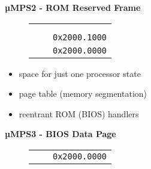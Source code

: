 \documentclass{beamer}
\begin{document}
\begin{frame}
\begin{center}
\begin{minipage}{0.48\textwidth}
\begin{block}{\textbf{{\small µMPS2 - ROM Reserved Frame}}}
\begin{figure}[h]
\begin{tabular}{rcl}
						\multicolumn{1}{l|}{}                                                    & \multicolumn{1}{c|}{\cellcolor{nord13}}                                                      &                                               \\
						\multicolumn{1}{l|}{}                                                    & \multicolumn{1}{c|}{\cellcolor{nord13}}                                                      &                                               \\
						\multicolumn{1}{l|}{}                                                    & \multicolumn{1}{c|}{\cellcolor{nord13}}                                                      & \multirow{2}{*}{\texttt{{\tiny 0x2000.1000}}} \\ \hhline{~-~}
						\multicolumn{1}{l|}{}                                                    & \multicolumn{1}{c|}{\cellcolor{nord12}}                                                      &                                               \\
						\multicolumn{1}{l|}{}                                                    & \multicolumn{1}{c|}{\multirow{-2}{*}{\cellcolor{nord12}{\tiny \textit{ROM Reserved Frame}}}} & \multirow{2}{*}{\texttt{{\tiny 0x2000.0000}}} \\ \hhline{--~}
					\end{tabular}
				\end{figure}
				\begin{scriptsize}
					\begin{itemize}
						\item space for just one processor state
						\item page table (memory segmentation)
						\item reentrant ROM (BIOS) handlers
					\end{itemize}
				\end{scriptsize}
			\end{block}
		\end{minipage}
		\hspace{0pt plus 1 filll}
		\begin{minipage}{0.47\textwidth}
			\begin{block}{\textbf{{\small µMPS3 - BIOS Data Page}}}
				\begin{figure}[h]
					\centering
					\renewcommand{\arraystretch}{0.5}
					\begin{tabular}{rcl}
						                                                                         &                                                                                                & \multirow{2}{*}{\texttt{{\tiny 0x2000.0000}}} \\ \hhline{--~}

\end{tabular}
\end{figure}
\end{block}
\end{minipage}
\end{center}
\end{frame}
\end{document}
